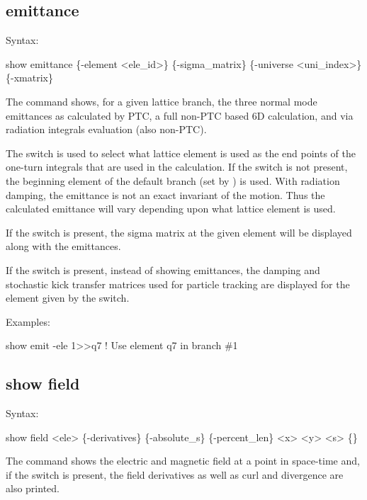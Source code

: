 {{{{{{{{\subsection{emittance}
\label{s:show.emit}

Syntax:
\begin{example}
  show emittance \{-element <ele_id>\} \{-sigma_matrix\} \{-universe <uni_index>\} \{-xmatrix\} 
\end{example}

The  command shows, for a given lattice branch, the three normal mode emittances
as calculated by PTC, a full non-PTC based 6D calculation, and via radiation integrals evaluation
(also non-PTC).

The  switch is used to select what lattice element is used as the end points of the
one-turn integrals that are used in the calculation. If the  switch is not present, the
beginning element of the default branch (set by ) is used. With radiation
damping, the emittance is not an exact invariant of the motion. Thus the calculated emittance will
vary depending upon what lattice element is used.

If the  switch is present, the sigma matrix at the given element will be displayed
along with the emittances.

If the  switch is present, instead of showing emittances, the damping and stochastic
kick transfer matrices used for particle tracking are displayed for the element given by the
 switch.

Examples:
\begin{example}
  show emit -ele 1>>q7  ! Use element q7 in branch \#1
\end{example}


\subsection{show field}
\label{s:show.field}

Syntax:
\begin{example}
  show field <ele> \{-derivatives\} \{-absolute_s\} \{-percent_len\} <x> <y> <s> \{<t-or-z>\}
\end{example}

The  command shows the electric and magnetic field at a point in space-time and, if
the  switch is present, the field derivatives as well as curl and divergence are
also printed.

}}}}}}}}
